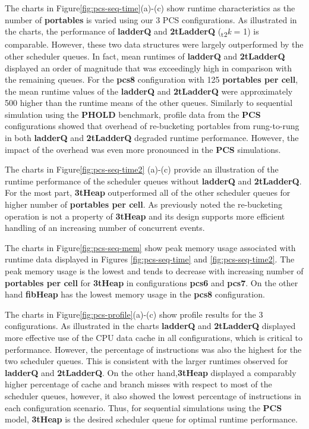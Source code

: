 The charts in Figure\ref{fig:pcs-seq-time}(a)-(c) show runtime characteristics as the number of \textbf{portables} is varied using our 3 PCS configurations. As illustrated in the charts, the performance of \textbf{ladderQ} and \textbf{2tLadderQ} (\textsubscript{t2}\textit{k} = 1) is comparable. However, these two data structures were largely outperformed by the other scheduler queues. In fact, mean runtimes of \textbf{ladderQ} and \textbf{2tLadderQ} displayed an order of magnitude that was exceedingly high in comparison with the remaining queues. For the \textbf{pcs8} configuration with 125 \textbf{portables per cell}, the mean runtime values of the \textbf{ladderQ} and \textbf{2tLadderQ} were approximately 500\texttimes\/ higher than the runtime means of the other queues. Similarly to sequential simulation using the \textbf{PHOLD} benchmark, profile data from the \textbf{PCS} configurations showed that overhead of re-bucketing portables from rung-to-rung in both \textbf{ladderQ} and \textbf{2tLadderQ} degraded runtime performance. However, the impact of the overhead was even more pronounced in the \textbf{PCS} simulations.

The charts in Figure\ref{fig:pcs-seq-time2} (a)-(c) provide an illustration of the runtime performance of the scheduler queues without \textbf{ladderQ} and \textbf{2tLadderQ}. For the most part, \textbf{3tHeap} outperformed all of the other scheduler queues for higher number of \textbf{portables per cell}. As previously noted the re-bucketing operation is not a property of \textbf{3tHeap} and its design supports more efficient handling of an increasing number of concurrent events. 

The charts in Figure\ref{fig:pcs-seq-mem} show peak memory usage associated with runtime data displayed in Figures \ref{fig:pcs-seq-time} and \ref{fig:pcs-seq-time2}. The peak memory usage  is the lowest and tends to decrease with increasing number of \textbf{portables per cell} for \textbf{3tHeap} in configurations \textbf{pcs6} and \textbf{pcs7}. On the other hand \textbf{fibHeap} has the lowest memory usage in the \textbf{pcs8} configuration.

The charts in Figure\ref{fig:pcs-profile}(a)-(c) show profile results for the 3 configurations. As illustrated in the charts \textbf{ladderQ} and \textbf{2tLadderQ} displayed more effective use of the CPU data cache in all configurations, which is critical to performance. However, the percentage of instructions was also the highest for the two scheduler queues. This is consistent with the larger runtimes observed for \textbf{ladderQ} and \textbf{2tLadderQ}. On the other hand,\textbf{3tHeap} displayed a comparably higher percentage of cache and branch misses with respect to most of the scheduler queues, however, it also showed the lowest percentage of instructions in each configuration scenario. Thus, for sequential simulations using the \textbf{PCS} model, \textbf{3tHeap} is the desired scheduler queue for optimal runtime performance.

